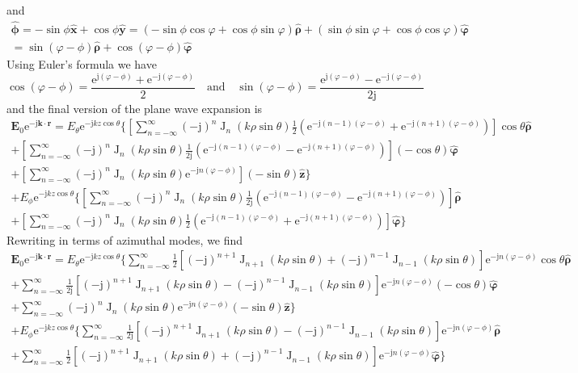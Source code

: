 \documentclass[a4paper,12pt]{article}
\renewcommand{\vec}[1]{\boldsymbol{#1}}
\newcommand{\unitvec}[1]{\hat{\vec{#1}}}
\newcommand{\mrm}[1]{\mathrm{#1}}
\newcommand{\ju}{\mrm{j}}
\newcommand{\eu}{\mrm{e}}
\newcommand{\Ev}{\vec{E}}
\newcommand{\rv}{\vec{r}}
\newcommand{\kv}{\vec{k}}
\newcommand{\xuv}{\unitvec{x}}
\newcommand{\yuv}{\unitvec{y}}
\newcommand{\zuv}{\unitvec{z}}
\newcommand{\rhouv}{\unitvec{\rho}}
\newcommand{\varphiuv}{\unitvec{\varphi}}
\newcommand{\phiuv}{\unitvec{\phi}}
\newcommand{\BesselJ}{\operatorname{J}}
\begin{document}
and
\begin{multline}
  \phiuv = -\sin\phi\xuv + \cos\phi\yuv = (-\sin\phi\cos\varphi + \cos\phi\sin\varphi)\rhouv + (\sin\phi\sin\varphi + \cos\phi\cos\varphi)\varphiuv \\
  = \sin(\varphi-\phi)\rhouv + \cos(\varphi-\phi)\varphiuv
\end{multline}
Using Euler's formula we have
\begin{equation}
  \cos(\varphi-\phi) = \frac{\eu^{\ju(\varphi-\phi)}+\eu^{-\ju(\varphi-\phi)}}{2} \quad\text{and}\quad \sin(\varphi-\phi) = \frac{\eu^{\ju(\varphi-\phi)}-\eu^{-\ju(\varphi-\phi)}}{2\ju}
\end{equation}
and the final version of the plane wave expansion is
\begin{multline}
  \Ev_{0}\eu^{-\ju\kv\cdot\rv} = E_{\theta}\eu^{-\ju kz\cos\theta} \Bigg\{ \left[ \sum_{n=-\infty}^{\infty}(-\ju)^{n}\BesselJ_{n}(k\rho\sin\theta)\frac{1}{2}(\eu^{-\ju (n-1)(\varphi-\phi)} + \eu^{-\ju (n+1)(\varphi-\phi)}) \right]\cos\theta\rhouv \\
  + \left[ \sum_{n=-\infty}^{\infty}(-\ju)^{n}\BesselJ_{n}(k\rho\sin\theta) \frac{1}{2\ju}(\eu^{-\ju (n-1)(\varphi-\phi)} - \eu^{-\ju (n+1)(\varphi-\phi)}) \right](-\cos\theta)\varphiuv \\
  + \left[ \sum_{n=-\infty}^{\infty}(-\ju)^{n}\BesselJ_{n}(k\rho\sin\theta)\eu^{-\ju n(\varphi-\phi)}\right](-\sin\theta)\zuv \Bigg\} \\
  + E_{\phi}\eu^{-\ju kz\cos\theta} \Bigg\{ \left[ \sum_{n=-\infty}^{\infty}(-\ju)^{n}\BesselJ_{n}(k\rho\sin\theta) \frac{1}{2\ju}(\eu^{-\ju (n-1)(\varphi-\phi)} - \eu^{-\ju (n+1)(\varphi-\phi)}) \right]\rhouv \\
  + \left[ \sum_{n=-\infty}^{\infty}(-\ju)^{n}\BesselJ_{n}(k\rho\sin\theta)\frac{1}{2}(\eu^{-\ju (n-1)(\varphi-\phi)} + \eu^{-\ju (n+1)(\varphi-\phi)}) \right] \varphiuv \Bigg\}
\end{multline}
Rewriting in terms of azimuthal modes, we find
\begin{multline}
  \Ev_{0}\eu^{-\ju\kv\cdot\rv} = E_{\theta}\eu^{-\ju kz\cos\theta} \Bigg\{ \sum_{n=-\infty}^{\infty} \frac{1}{2}\left[ (-\ju)^{n+1}\BesselJ_{n+1}(k\rho\sin\theta) + (-\ju)^{n-1}\BesselJ_{n-1}(k\rho\sin\theta)\right] \eu^{-\ju n(\varphi-\phi)} \cos\theta\rhouv \\
  + \sum_{n=-\infty}^{\infty} \frac{1}{2\ju}\left[ (-\ju)^{n+1}\BesselJ_{n+1}(k\rho\sin\theta) - (-\ju)^{n-1}\BesselJ_{n-1}(k\rho\sin\theta)\right] \eu^{-\ju n(\varphi-\phi)} (-\cos\theta)\varphiuv \\
  + \sum_{n=-\infty}^{\infty}(-\ju)^{n}\BesselJ_{n}(k\rho\sin\theta)\eu^{-\ju n(\varphi-\phi)} (-\sin\theta)\zuv \Bigg\} \\
  + E_{\phi}\eu^{-\ju kz\cos\theta} \Bigg\{ \sum_{n=-\infty}^{\infty} \frac{1}{2\ju} \left[ (-\ju)^{n+1}\BesselJ_{n+1}(k\rho\sin\theta) - (-\ju)^{n-1}\BesselJ_{n-1}(k\rho\sin\theta)\right] \eu^{-\ju n(\varphi-\phi)} \rhouv \\
  + \sum_{n=-\infty}^{\infty} \frac{1}{2} \left[ (-\ju)^{n+1}\BesselJ_{n+1}(k\rho\sin\theta) + (-\ju)^{n-1}\BesselJ_{n-1}(k\rho\sin\theta) \right] \eu^{-\ju n(\varphi-\phi)} \varphiuv \Bigg\}
  \label{eq:planewave}
\end{multline}
\end{document}

